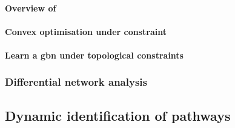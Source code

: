 \paragraph{Overview of }
\paragraph{Convex optimisation under constraint}
\paragraph{Learn a \gls{gbn} under topological constraints}

\subsubsection{Differential network analysis}

\subsection{Dynamic identification of pathways}


